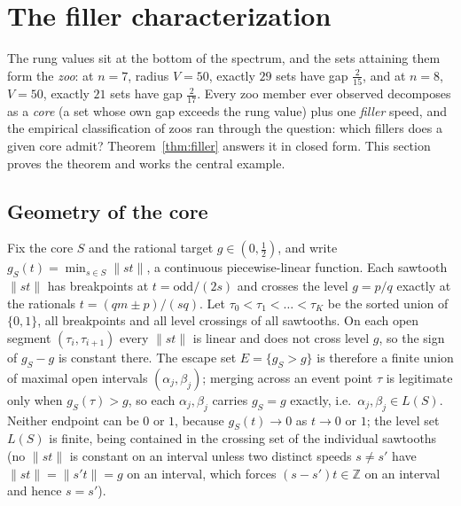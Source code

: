 \documentclass[11pt,a4paper]{article}
\theoremstyle{plain}
\theoremstyle{definition}
\theoremstyle{remark}
\newcommand{\norm}[1]{\lVert #1 \rVert}
\newcommand{\Z}{\mathbb{Z}}
\begin{document}
\section{The filler characterization}\label{sec:filler}

The rung values sit at the bottom of the spectrum, and the sets attaining
them form the \emph{zoo}: at $n = 7$, radius $V = 50$, exactly $29$ sets have
gap $\tfrac{2}{15}$, and at $n = 8$, $V = 50$, exactly $21$ sets have gap
$\tfrac{2}{17}$. Every zoo member ever observed decomposes as a \emph{core}
(a set whose own gap exceeds the rung value) plus one \emph{filler} speed,
and the empirical classification of zoos ran through the question: which
fillers does a given core admit? Theorem~\ref{thm:filler} answers it in
closed form. This section proves the theorem and works the central example.

\subsection{Geometry of the core}

Fix the core $S$ and the rational target $g \in (0, \tfrac12)$, and write
$g_S(t) = \min_{s \in S} \norm{st}$, a continuous piecewise-linear function.
Each sawtooth $\norm{st}$ has breakpoints at $t = \text{odd}/(2s)$ and
crosses the level $g = p/q$ exactly at the rationals $t = (qm \pm p)/(sq)$.
Let $\tau_0 < \tau_1 < \dots < \tau_K$ be the sorted union of $\{0, 1\}$,
all breakpoints and all level crossings of all sawtooths. On each open
segment $(\tau_i, \tau_{i+1})$ every $\norm{st}$ is linear and does not
cross level $g$, so the sign of $g_S - g$ is constant there. The escape set
$E = \{g_S > g\}$ is therefore a finite union of maximal open intervals
$(\alpha_j, \beta_j)$; merging across an event point $\tau$ is legitimate
only when $g_S(\tau) > g$, so each $\alpha_j, \beta_j$ carries
$g_S = g$ exactly, i.e.\ $\alpha_j, \beta_j \in L(S)$. Neither endpoint can
be $0$ or $1$, because $g_S(t) \to 0$ as $t \to 0$ or $1$; the level set
$L(S)$ is finite, being contained in the crossing set of the individual
sawtooths (no $\norm{st}$ is constant on an interval unless two distinct
speeds $s \ne s'$ have $\norm{st} = \norm{s't} = g$ on an interval, which
forces $(s - s')t \in \Z$ on an interval and hence $s = s'$).
\end{document}
